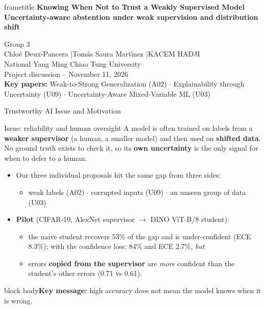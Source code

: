 \documentclass[aspectratio=169,10pt]{beamer}
\newcommand{\keymsg}[1]{%
  \begin{beamercolorbox}[wd=\textwidth,sep=0.7em,rounded=true]{block body}\small\textbf{Key message:} #1\end{beamercolorbox}}
\begin{document}
\begin{frame}[plain]
\vspace{1.4em}
\begin{beamercolorbox}[wd=0.92\paperwidth,sep=0.8em,center,rounded=true,shadow=true]{frametitle}
{\large\bfseries Knowing When Not to Trust a Weakly Supervised Model}\\[0.3em]
\small\bfseries Uncertainty-aware abstention under weak supervision and distribution shift
\end{beamercolorbox}
\vspace{1.4em}
\centering
Group 3\\[0.4em] Chlo\'e Deux-Pancera \quad|\quad Tom\'as Saura Mart\'{\i}nez \quad|\quad KACEM HADJI\\[0.6em]
{\scriptsize National Yang Ming Chiao Tung University}\\[0.6em]
Project discussion -- November 11, 2026\\[1.2em]
\footnotesize\textbf{Key papers:} Weak-to-Strong Generalization (A02) \;$\cdot$\; Explainability through Uncertainty (U09)
\;$\cdot$\; Uncertainty-Aware Mixed-Variable ML (U03)
\end{frame}

\begin{frame}{Trustworthy AI Issue and Motivation}
\begin{block}{Issue: reliability and human oversight}
A model is often trained on labels from a \textbf{weaker supervisor} (a human, a smaller model) and then
used on \textbf{shifted data}. No ground truth exists to check it, so its \textbf{own uncertainty} is the only
signal for when to defer to a human.
\end{block}
\begin{itemize}\small
\item Our three individual proposals hit the same gap from three sides:
  \begin{itemize}\footnotesize
  \item weak labels (A02) \quad $\cdot$ \quad corrupted inputs (U09) \quad $\cdot$ \quad an unseen group of data (U03)
  \end{itemize}
\item \textbf{Pilot} (CIFAR-10, AlexNet supervisor $\to$ DINO ViT-B/8 student):
  \begin{itemize}\footnotesize
  \item the naive student recovers 53\% of the gap and is under-confident (ECE 8.3\%);
    with the confidence loss: 84\% and ECE 2.7\%, \emph{but}
  \item errors \textbf{copied from the supervisor} are \emph{more} confident than the student's other errors (0.71 vs 0.61).
  \end{itemize}
\end{itemize}
\keymsg{high accuracy does not mean the model knows when it is wrong.}
\end{frame}
\end{document}
